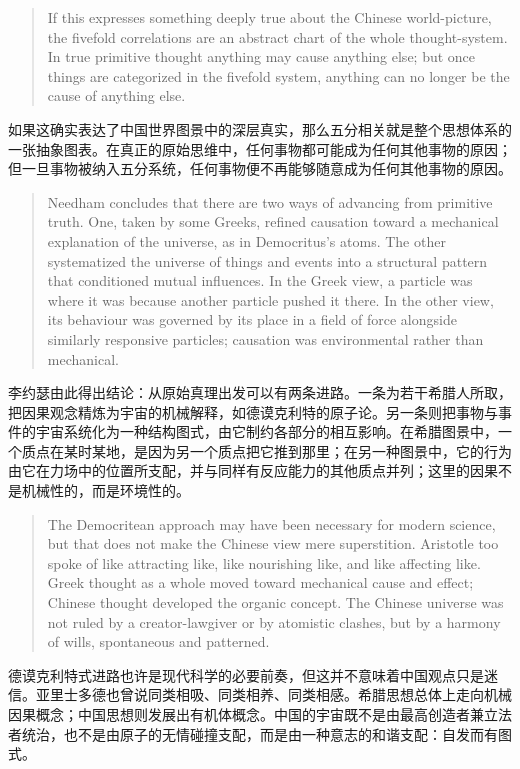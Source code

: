 \documentclass[UTF8,zihao=-4]{ctexart}
\newenvironment{enblock}
  {\par\smallskip\noindent{\scriptsize\bfseries English}\par\begin{quote}\small}
  {\end{quote}}
\newenvironment{zhblock}
  {\par\noindent{\scriptsize\bfseries 中文}\par}
  {\par\medskip}
\begin{document}
\begin{enblock}
If this expresses something deeply true about the Chinese world-picture, the fivefold correlations are an abstract chart of the whole thought-system. In true primitive thought anything may cause anything else; but once things are categorized in the fivefold system, anything can no longer be the cause of anything else.
\end{enblock}
\begin{zhblock}
如果这确实表达了中国世界图景中的深层真实，那么五分相关就是整个思想体系的一张抽象图表。在真正的原始思维中，任何事物都可能成为任何其他事物的原因；但一旦事物被纳入五分系统，任何事物便不再能够随意成为任何其他事物的原因。
\end{zhblock}

\begin{enblock}
Needham concludes that there are two ways of advancing from primitive truth. One, taken by some Greeks, refined causation toward a mechanical explanation of the universe, as in Democritus's atoms. The other systematized the universe of things and events into a structural pattern that conditioned mutual influences. In the Greek view, a particle was where it was because another particle pushed it there. In the other view, its behaviour was governed by its place in a field of force alongside similarly responsive particles; causation was environmental rather than mechanical.
\end{enblock}
\begin{zhblock}
李约瑟由此得出结论：从原始真理出发可以有两条进路。一条为若干希腊人所取，把因果观念精炼为宇宙的机械解释，如德谟克利特的原子论。另一条则把事物与事件的宇宙系统化为一种结构图式，由它制约各部分的相互影响。在希腊图景中，一个质点在某时某地，是因为另一个质点把它推到那里；在另一种图景中，它的行为由它在力场中的位置所支配，并与同样有反应能力的其他质点并列；这里的因果不是机械性的，而是环境性的。
\end{zhblock}

\begin{enblock}
The Democritean approach may have been necessary for modern science, but that does not make the Chinese view mere superstition. Aristotle too spoke of like attracting like, like nourishing like, and like affecting like. Greek thought as a whole moved toward mechanical cause and effect; Chinese thought developed the organic concept. The Chinese universe was not ruled by a creator-lawgiver or by atomistic clashes, but by a harmony of wills, spontaneous and patterned.
\end{enblock}
\begin{zhblock}
德谟克利特式进路也许是现代科学的必要前奏，但这并不意味着中国观点只是迷信。亚里士多德也曾说同类相吸、同类相养、同类相感。希腊思想总体上走向机械因果概念；中国思想则发展出有机体概念。中国的宇宙既不是由最高创造者兼立法者统治，也不是由原子的无情碰撞支配，而是由一种意志的和谐支配：自发而有图式。
\end{zhblock}
\end{document}
